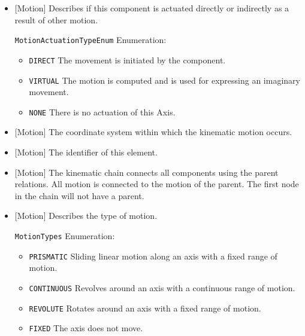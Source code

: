 \begin{itemize}

\item {}[Motion] \newline Describes if this component is actuated directly or indirectly as a result of other motion.

\texttt{MotionActuationTypeEnum} Enumeration:

\begin{itemize}
\item \texttt{DIRECT} \newline The movement is initiated by the component. 
\item \texttt{VIRTUAL} \newline The motion is computed and is used for expressing an imaginary movement. 
\item \texttt{NONE} \newline There is no actuation of this Axis. 
\end{itemize}


\item {}[Motion] \newline The coordinate system within which the kinematic motion occurs.

\item {}[Motion] \newline The identifier of this element.

\item {}[Motion] \newline The kinematic chain connects all components using the parent relations. All motion is connected to the motion of the parent. The first node in the chain will not have a parent.

\item {}[Motion] \newline Describes the type of motion.

\texttt{MotionTypes} Enumeration:

\begin{itemize}
\item \texttt{PRISMATIC} \newline Sliding linear motion along an axis with a fixed range of motion. 
\item \texttt{CONTINUOUS} \newline Revolves around an axis with a continuous range of motion. 
\item \texttt{REVOLUTE} \newline Rotates around an axis with a fixed range of motion. 
\item \texttt{FIXED} \newline The axis does not move. 
\end{itemize}

\end{itemize}

